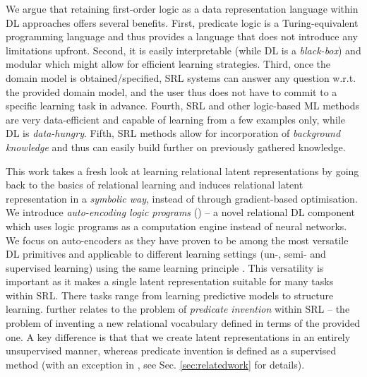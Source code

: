 We argue that retaining first-order logic as a data representation language within DL approaches offers several benefits. 
First, predicate logic is a Turing-equivalent programming language and thus provides a language that does not introduce any limitations upfront. 
Second, it is easily interpretable (while DL is a \textit{black-box}) and modular which might allow for efficient learning strategies.
Third, once the domain model is obtained/specified, SRL systems can answer any question w.r.t. the provided domain model, and the user thus does not have to commit to a specific learning task in advance. 
Fourth, SRL and other logic-based ML methods are very data-efficient and capable of learning from a few examples only, while DL is \textit{data-hungry}.
Fifth, SRL methods allow for incorporation of \textit{background knowledge} and thus can easily build further on previously gathered knowledge.






This work takes a fresh look at learning relational latent representations by going back to the basics of relational learning and induces relational latent representation in a \textit{symbolic way}, instead of through gradient-based optimisation.
We introduce \textit{auto-encoding logic programs} () -- a novel relational DL component which uses logic programs as a computation engine instead of neural networks.
We focus on auto-encoders as they have proven to be among the most versatile DL primitives and applicable to different learning settings (un-, semi- and supervised learning) using the same learning principle \cite{SSLVAE2014,VincentDaE,Kingma2014,BengioSAE}.
This versatility is important as it makes a single latent representation suitable for many tasks within SRL. 
There tasks range from learning predictive models to structure learning.
 further relates to the problem of \textit{predicate invention} \cite{Kramer1995,Muggleton2015,Cropper2018,Kok2007} within SRL -- the problem of inventing a new relational vocabulary defined in terms of the provided one. 
A key difference is that that we create latent representations in an entirely unsupervised manner, whereas predicate invention is defined as a supervised method (with an exception in \cite{Kok:2007:SPI:1273496.1273551}, see Sec. \ref{sec:relatedwork} for details).




